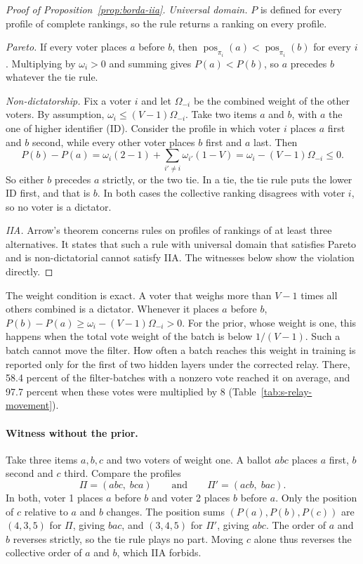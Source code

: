 \begin{proof}[Proof of Proposition~\ref{prop:borda-iia}]
\emph{Universal domain.} $P$ is defined for every profile of complete rankings, so the rule returns a ranking on every profile.

\emph{Pareto.} If every voter places $a$ before $b$, then $\operatorname{pos}_{\pi_i}(a)<\operatorname{pos}_{\pi_i}(b)$ for every $i$. Multiplying by $\omega_i>0$ and summing gives $P(a)<P(b)$, so $a$ precedes $b$ whatever the tie rule.

\emph{Non-dictatorship.} Fix a voter $i$ and let $\Omega_{-i}$ be the combined weight of the other voters. By assumption, $\omega_i\le(V-1)\Omega_{-i}$. Take two items $a$ and $b$, with $a$ the one of higher identifier (ID). Consider the profile in which voter $i$ places $a$ first and $b$ second, while every other voter places $b$ first and $a$ last. Then
\[
P(b)-P(a)=\omega_i(2-1)+\sum_{i'\neq i}\omega_{i'}(1-V)=\omega_i-(V-1)\Omega_{-i}\le0.
\]
So either $b$ precedes $a$ strictly, or the two tie. In a tie, the tie rule puts the lower ID first, and that is $b$. In both cases the collective ranking disagrees with voter $i$, so no voter is a dictator.

\emph{IIA.} Arrow's theorem \citep{arrow1963social} concerns rules on profiles of rankings of at least three alternatives. It states that such a rule with universal domain that satisfies Pareto and is non-dictatorial cannot satisfy IIA. The witnesses below show the violation directly.
\end{proof}

The weight condition is exact. A voter that weighs more than $V-1$ times all others combined is a dictator. Whenever it places $a$ before $b$, $P(b)-P(a)\ge\omega_i-(V-1)\Omega_{-i}>0$. For the prior, whose weight is one, this happens when the total vote weight of the batch is below $1/(V-1)$. Such a batch cannot move the filter. How often a batch reaches this weight in training is reported only for the first of two hidden layers under the corrected relay. There, 58.4 percent of the filter-batches with a nonzero vote reached it on average, and 97.7 percent when these votes were multiplied by 8 (Table~\ref{tab:s-relay-movement}).

\paragraph{Witness without the prior.}
Take three items $a,b,c$ and two voters of weight one. A ballot $abc$ places $a$ first, $b$ second and $c$ third. Compare the profiles
\[
\Pi=(abc,\;bca)\qquad\text{and}\qquad\Pi'=(acb,\;bac).
\]
In both, voter 1 places $a$ before $b$ and voter 2 places $b$ before $a$. Only the position of $c$ relative to $a$ and $b$ changes. The position sums $(P(a),P(b),P(c))$ are $(4,3,5)$ for $\Pi$, giving $bac$, and $(3,4,5)$ for $\Pi'$, giving $abc$. The order of $a$ and $b$ reverses strictly, so the tie rule plays no part. Moving $c$ alone thus reverses the collective order of $a$ and $b$, which IIA forbids.

